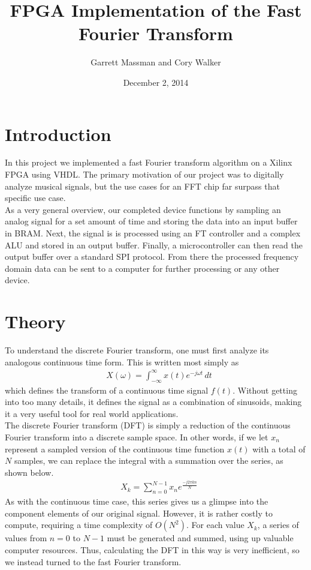\documentclass[12pt]{article}
\title{\textbf{FPGA Implementation of the Fast Fourier Transform}}
\date{December 2, 2014}
\author{Garrett Massman and Cory Walker}
\begin{document}
  \maketitle
  \clearpage

  \section*{Introduction}
    In this project we implemented a fast Fourier transform algorithm on a Xilinx FPGA using VHDL. The primary motivation of our project was to digitally analyze musical signals, but the use cases for an FFT chip far surpass that specific use case. \\
    
    As a very general overview, our completed device functions by sampling an analog signal for a set amount of time and storing the data into an input buffer in BRAM. Next, the signal is is processed using an FT controller and a complex ALU and stored in an output buffer. Finally, a microcontroller can then read the output buffer over a standard SPI protocol. From there the processed frequency domain data can be sent to a computer for further processing or any other device.

  \section*{Theory}
    To understand the discrete Fourier transform, one must first analyze its analogous continuous    time form.
    This is written most simply as
    \begin{align*}
    &X(\omega) = \int_{-\infty}^{\infty} x(t) e^{-j \omega t}\,dt
    \end{align*}
    which defines the transform of a continuous time signal $f(t)$.
    Without getting into too many details, it defines the signal as a combination of sinusoids,      making it a very useful tool for real world applications.\\

    The discrete Fourier transform (DFT) is simply a reduction of the continuous Fourier transform   into a discrete sample space.
    In other words, if we let $x_n$ represent a sampled version of the continuous time function      $x(t)$ with a total of $N$ samples, we can replace the integral with a summation over the series, as shown below.
    \begin{align*}
        &X_k = \sum\limits_{n=0}^{N-1} x_n e^{\frac{-j2\pi kn}{N}}
    \end{align*}
    As with the continuous time case, this series gives us a glimpse into the component elements of  our original signal.
    However, it is rather costly to compute, requiring a time complexity of $O(N^2)$.
    For each value $X_k$, a series of values from $n = 0$ to $N - 1$ must be generated and summed,   using up valuable computer resources.
    Thus, calculating the DFT in this way is very inefficient, so we instead turned to the fast  Fourier transform.\\
\end{document}
